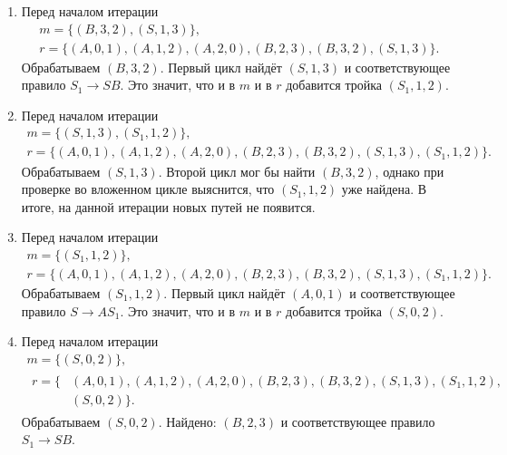\begin{example}
\begin{enumerate}
        \item Перед началом итерации
              \begin{gather*}
                  m = \{(B, 3, 2), (S, 1, 3)\},\\
                  r = \{(A, 0, 1), (A, 1, 2), (A, 2, 0), (B, 2, 3), (B, 3, 2), (S, 1, 3)\}.
              \end{gather*}
              Обрабатываем $(B, 3, 2)$.
              Первый цикл найдёт $(S, 1, 3)$ и соответствующее правило $S_1 \to S B$.
              Это значит, что и в $m$ и в $r$ добавится тройка $(S_1, 1, 2)$.
        \item Перед началом итерации
              \begin{gather*}
                  m = \{(S, 1, 3), (S_1, 1, 2)\},\\
                  r = \{(A, 0, 1), (A, 1, 2), (A, 2, 0), (B, 2, 3), (B, 3, 2), (S, 1, 3), (S_1, 1, 2)\}.
              \end{gather*}
              Обрабатываем $(S, 1, 3)$.
              Второй цикл мог бы найти $(B, 3, 2)$, однако при проверке во вложенном цикле выяснится, что $(S_1, 1, 2)$ уже найдена.
              В итоге, на данной итерации новых путей не появится.
        \item Перед началом итерации
              \begin{gather*}
                  m = \{(S_1, 1, 2)\}, \\
                  r = \{(A, 0, 1), (A, 1, 2), (A, 2, 0), (B, 2, 3), (B, 3, 2), (S, 1, 3), (S_1, 1, 2)\}.
              \end{gather*}
              Обрабатываем $(S_1, 1, 2)$.
              Первый цикл найдёт $(A, 0, 1)$ и соответствующее правило $S \to A S_1$.
              Это значит, что и в $m$ и в $r$ добавится тройка $(S, 0, 2)$.
        \item Перед началом итерации
              \begin{gather*}
                  m = \{(S, 0, 2)\}, \\
                  \begin{aligned}
                      r = \{ & (A, 0, 1), (A, 1, 2), (A, 2, 0), (B, 2, 3), (B, 3, 2), (S, 1, 3), (S_1, 1, 2), \\
                             & (S, 0, 2)\}.
                  \end{aligned}
              \end{gather*}
              Обрабатываем $(S, 0, 2)$.
              Найдено: $(B, 2, 3)$ и соответствующее правило $S_1 \to S B$.

\end{enumerate}
\end{example}
